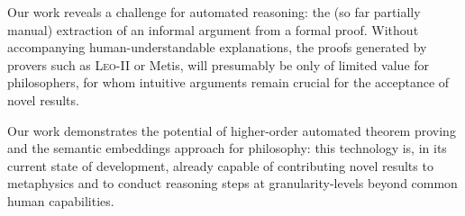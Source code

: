 \documentclass{llncs}
\newcommand{\logic}[1]{\textbf{#1}\xspace}
\newcommand{\SFive}{\logic{S5}}
\newcommand{\SFiveU}{\logic{S5\textsuperscript{U}}}
\begin{document}


Our work reveals a challenge for automated reasoning:
the (so far partially manual) extraction of an informal argument from a formal proof. 
Without accompanying human-understandable explanations,
the proofs generated by provers such as \textsc{Leo-II} or Metis, will
presumably be only of limited value for philosophers, for whom intuitive
arguments remain crucial for the acceptance of novel results.



Our work 
demonstrates
the potential of higher-order automated theorem proving and the
semantic embeddings approach for philosophy: this technology is,
in its current state of development, already capable of contributing novel results to
metaphysics and to conduct reasoning steps at granularity-levels
beyond common human capabilities.  
\vfill


\end{document}
